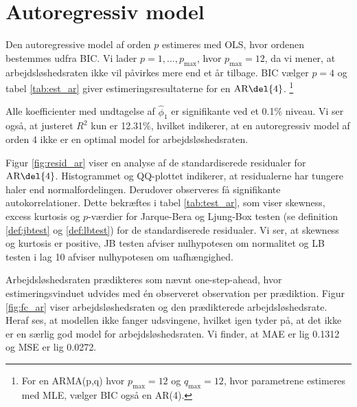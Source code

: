 \section{Autoregressiv model}
Den autoregressive model af orden \(p\) estimeres med OLS, hvor ordenen bestemmes udfra BIC.
Vi lader $p = 1, \ldots, p_{\max}$, hvor \(p_\text{max}=12\), da vi mener, at arbejdsløshedsraten ikke vil påvirkes mere end et år tilbage.
BIC vælger \(p=4\) og tabel \ref{tab:est_ar} giver estimeringsresultaterne for en \(\text{AR} \del{4}\). \footnote{For en ARMA(p,q) hvor $p_{\max} = 12$ og $q_{\max} = 12$, hvor parametrene estimeres med MLE, vælger BIC også en AR(4).}
%


Alle koefficienter med undtagelse af $\widehat\phi_1$ er signifikante ved et 0.1\% niveau. 
Vi ser også, at justeret $R^2$ kun er 12.31\%, hvilket indikerer, at en autoregressiv model af orden 4 ikke er en optimal model for arbejdsløshedsraten. 



Figur \ref{fig:resid_ar} viser en analyse af de standardiserede residualer for \(\text{AR} \del{4}\). 
Histogrammet og QQ-plottet indikerer, at residualerne har tungere haler end normalfordelingen. 
Derudover observeres få signifikante autokorrelationer.
Dette bekræftes i tabel \ref{tab:test_ar}, som viser skewness, excess kurtosis og \(p\)-værdier for Jarque-Bera og Ljung-Box testen (se definition \ref{def:jbtest} og \ref{def:lbtest}) for de standardiserede residualer. 
Vi ser, at skewness og kurtosis er positive, JB testen afviser nulhypotesen om normalitet og LB testen i lag 10 afviser nulhypotesen om uafhængighed.

Arbejdsløshedsraten prædikteres som nævnt one-step-ahead, hvor estimeringsvinduet udvides med én observeret observation per prædiktion.
Figur \ref{fig:fc_ar} viser arbejdsløshedsraten og den prædikterede arbejdsløshedsrate. 
Heraf ses, at modellen ikke fanger udsvingene, hvilket igen tyder på, at det ikke er en særlig god model for arbejdsløshedsraten. 
Vi finder, at MAE er lig 0.1312 og MSE er lig 0.0272.
%

\newpage